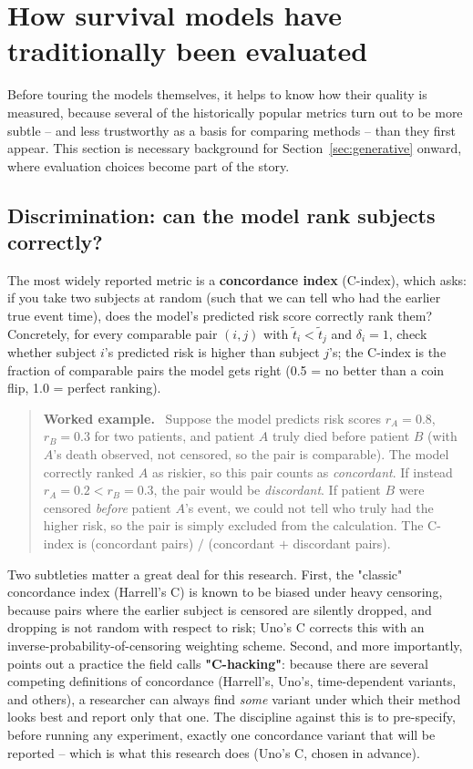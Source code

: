 \documentclass[11pt]{article}
\newenvironment{worked}
  {\par\addvspace{8pt}\begin{quote}\noindent\textbf{\textcolor{black!50!white}{Worked example.}}\ }
  {\end{quote}\par\addvspace{8pt}}
\begin{document}
\section{How survival models have traditionally been evaluated}
\label{sec:evaluation}

Before touring the models themselves, it helps to know how their quality
is measured, because several of the historically popular metrics turn
out to be more subtle -- and less trustworthy as a basis for comparing
methods -- than they first appear. This section is necessary background
for Section~\ref{sec:generative} onward, where evaluation choices become
part of the story.

\subsection{Discrimination: can the model rank subjects correctly?}

The most widely reported metric is a \textbf{concordance index}
(C-index), which asks: if you take two subjects at random (such that we
can tell who had the earlier true event time), does the model's
predicted risk score correctly rank them? Concretely, for every
comparable pair $(i, j)$ with $\tilde t_i < \tilde t_j$ and $\delta_i =
1$, check whether subject $i$'s predicted risk is higher than subject
$j$'s; the C-index is the fraction of comparable pairs the model gets
right (0.5 = no better than a coin flip, 1.0 = perfect ranking).

\begin{worked}
Suppose the model predicts risk scores $r_A = 0.8$, $r_B = 0.3$ for two
patients, and patient $A$ truly died before patient $B$ (with $A$'s death
observed, not censored, so the pair is comparable). The model correctly
ranked $A$ as riskier, so this pair counts as \emph{concordant}. If
instead $r_A = 0.2 < r_B = 0.3$, the pair would be \emph{discordant}. If
patient $B$ were censored \emph{before} patient $A$'s event, we could not
tell who truly had the higher risk, so the pair is simply excluded from
the calculation. The C-index is (concordant pairs) $/$ (concordant $+$
discordant pairs).
\end{worked}

Two subtleties matter a great deal for this research. First, the
"classic" concordance index (Harrell's C) is known to be biased under
heavy censoring, because pairs where the earlier subject is censored are
silently dropped, and dropping is not random with respect to risk; Uno's
C \citep{uno2011} corrects this with an inverse-probability-of-censoring
weighting scheme. Second, and more importantly, \citet{sonabend2022chacking}
points out a practice the field calls \textbf{"C-hacking"}: because there
are several competing definitions of concordance (Harrell's, Uno's,
time-dependent variants, and others), a researcher can always find
\emph{some} variant under which their method looks best and report only
that one. The discipline against this is to pre-specify, before running
any experiment, exactly one concordance variant that will be reported --
which is what this research does (Uno's C, chosen in advance).
\end{document}
